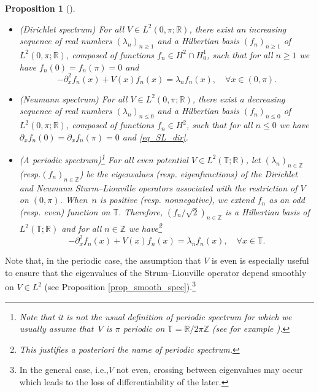 \documentclass[11pt]{article}
\newcommand{\ie}{i.e.,\xspace}
\newcommand{\resp}{resp.\xspace}
\newcommand{\skpt}{\smallskip}
\newtheorem{proposition}[theorem]{Proposition}
\theoremstyle{definition}
\begin{document}
\skpt
\begin{proposition}[{\cite[Th.\,7, p.\,43]{PT}}]\label{prop_def_SL}
\begin{itemize}
\item
(Dirichlet spectrum) For all $V\in L^2(0,\pi;\mathbb{R})$, there exist an increasing sequence of real numbers $(\lambda_n)_{n\geq 1}$ and a Hilbertian basis $(f_n)_{n\geq 1}$ of $L^2(0,\pi;\mathbb{R})$, composed of functions $f_n \in H^2 \cap H^1_0$, such that for all $n\geq 1$ we have $f_n(0) = f_n(\pi) = 0$ and
\begin{equation}
\label{eq_SL_dir}
-\partial_x^2 f_n(x) + V(x) f_n(x) = \lambda_n f_n(x), \quad \forall x\in (0,\pi).
\end{equation}

\item
(Neumann spectrum) For all $V\in L^2(0,\pi;\mathbb{R})$, there exist a decreasing sequence of real numbers $(\lambda_n)_{n \leq 0}$ and a Hilbertian basis $(f_n)_{n\leq 0}$ of $L^2(0,\pi;\mathbb{R})$, composed of functions $f_n \in H^2$, such that for all $n\leq 0$ we have $\partial_x f_n(0) = \partial_x f_n(\pi) = 0$ and \eqref{eq_SL_dir}.

\item
(A periodic spectrum)\footnote{Note that it is not the usual definition of periodic spectrum for which we usually assume that~$V$ is $\pi$ periodic on $\mathbb{T}=\mathbb{R}/2\pi \mathbb{Z}$ (see for example \cite[App.\,B]{KP}).} For all even potential $V\in L^2(\mathbb{T};\mathbb{R})$, let $(\lambda_n)_{n\in \mathbb{Z}}$ (\resp $(f_n)_{n\in \mathbb{Z}}$) be the eigenvalues (\resp eigenfunctions) of the Dirichlet and Neumann Sturm--Liouville operators associated with the restriction of $V$ on $(0,\pi)$. When~$n$ is positive (\resp nonnegative), we extend $f_n$ as an odd (\resp even) function on $\mathbb{T}$. Therefore, $(f_n/\sqrt2)_{n\in \mathbb{Z}}$ is a Hilbertian basis of $L^2(\mathbb{T};\mathbb{R})$ and for all $n\in \mathbb{Z}$ we have\footnote{This justifies a posteriori the name of \emph{periodic spectrum}.}%
\begin{equation}
\label{eq_SL_per}
-\partial_x^2 f_n(x) + V(x) f_n(x) = \lambda_n f_n(x), \quad \forall x\in \mathbb{T}.
\end{equation}
\end{itemize}
\end{proposition}
Note that, in the periodic case, the assumption that $V$ is even is especially useful to ensure that the eigenvalues of the Strum--Liouville operator depend smoothly on $V\in L^2$ (see Proposition \ref{prop_smooth_spec}).\footnote{In the general case, \ie $V$ not even, crossing between eigenvalues may occur which leads to the loss of differentiability of the later.}
\end{document}
